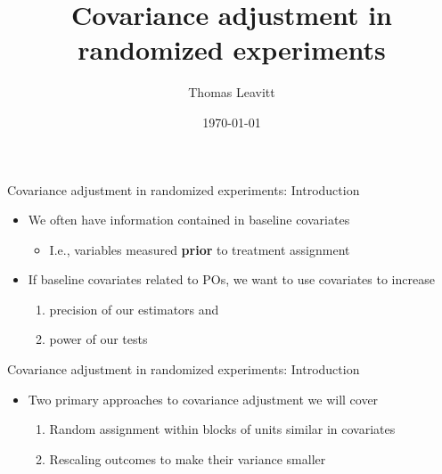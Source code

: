 \documentclass[table, xcolor = {dvipsnames}, 9pt]{beamer}
\title[]{Covariance adjustment in randomized experiments} %
\author{Thomas Leavitt} %
\institute[] %
{
\medskip
\textit{} %
}
\date{\today} %
\theoremstyle{plain}
\begin{document}
\begin{frame}
\titlepage %
\end{frame}


\begin{frame}{Covariance adjustment in randomized experiments: Introduction}
\vfill
\begin{itemize}
\item We often have information contained in baseline covariates\pause \vfill
\begin{itemize} \vfill
\item I.e., variables measured \textbf{prior} to treatment assignment \pause \vfill
\end{itemize} \vfill
\item If baseline covariates related to POs, we want to use covariates to increase\vfill
\begin{enumerate}
\item precision of our estimators and \vfill 
\item power of our tests \vfill
\end{enumerate} \vfill
\end{itemize} \vfill
\end{frame}
\begin{frame}{Covariance adjustment in randomized experiments: Introduction}
\vfill
\begin{itemize}
\item Two primary approaches to covariance adjustment we will cover \pause \vfill
\begin{enumerate} \vfill
\item Random assignment within blocks of units similar in covariates \pause \vfill
\item Rescaling outcomes to make their variance smaller  \vfill
\end{enumerate}  \vfill
\end{itemize} \vfill
\end{frame}
\end{document}

